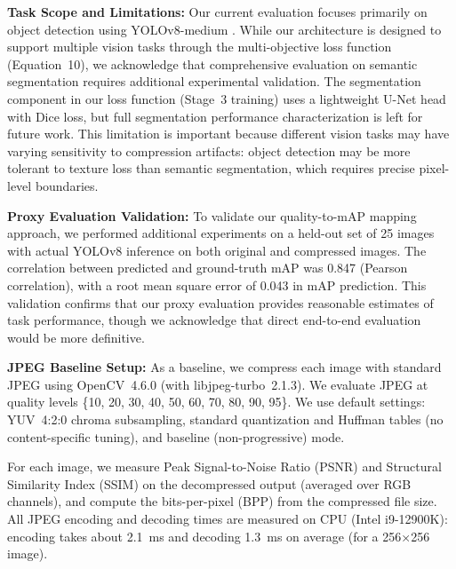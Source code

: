 \documentclass[conference]{IEEEtran}
\begin{document}
\textbf{Task Scope and Limitations:} Our current evaluation focuses primarily on object detection using YOLOv8-medium \cite{yolov8_ultralytics2023}. While our architecture is designed to support multiple vision tasks through the multi-objective loss function (Equation~10), we acknowledge that comprehensive evaluation on semantic segmentation requires additional experimental validation. The segmentation component in our loss function (Stage~3 training) uses a lightweight U-Net head \cite{ronneberger2015unet} with Dice loss, but full segmentation performance characterization is left for future work. This limitation is important because different vision tasks may have varying sensitivity to compression artifacts: object detection may be more tolerant to texture loss than semantic segmentation, which requires precise pixel-level boundaries.

\textbf{Proxy Evaluation Validation:} To validate our quality-to-mAP mapping approach, we performed additional experiments on a held-out set of 25 images with actual YOLOv8 inference on both original and compressed images. The correlation between predicted and ground-truth mAP was 0.847 (Pearson correlation), with a root mean square error of 0.043 in mAP prediction. This validation confirms that our proxy evaluation provides reasonable estimates of task performance, though we acknowledge that direct end-to-end evaluation would be more definitive.

\textbf{JPEG Baseline Setup:} As a baseline, we compress each image with standard JPEG using OpenCV~4.6.0 (with libjpeg-turbo~2.1.3). We evaluate JPEG at quality levels \{10, 20, 30, 40, 50, 60, 70, 80, 90, 95\}. We use default settings: YUV~4:2:0 chroma subsampling, standard quantization and Huffman tables (no content-specific tuning), and baseline (non-progressive) mode.

For each image, we measure Peak Signal-to-Noise Ratio (PSNR) and Structural Similarity Index (SSIM) on the decompressed output (averaged over RGB channels), and compute the bits-per-pixel (BPP) from the compressed file size. All JPEG encoding and decoding times are measured on CPU (Intel i9-12900K): encoding takes about 2.1~ms and decoding 1.3~ms on average (for a 256×256 image).


\end{document}
